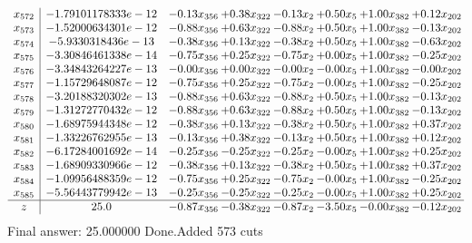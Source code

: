 \documentclass[8pt]{article}
\begin{document}
\[\begin{array}{c| c c@{\hskip 2pt} c@{\hskip 2pt} c@{\hskip 2pt} c@{\hskip 2pt} c@{\hskip 2pt} c@{\hskip 2pt} }
 x_{572}   &  -1.79101178333e-12 & -0.13 x_{356} & +  0.38 x_{322} & -0.13 x_{2} & +  0.50 x_{5} & +  1.00 x_{382} & +  0.12 x_{202}\\
 x_{573}   &  -1.52000634301e-12 & -0.88 x_{356} & +  0.63 x_{322} & -0.88 x_{2} & +  0.50 x_{5} & +  1.00 x_{382} & -0.13 x_{202}\\
 x_{574}   &  -5.9330318436e-13 & -0.38 x_{356} & +  0.13 x_{322} & -0.38 x_{2} & +  0.50 x_{5} & +  1.00 x_{382} & -0.63 x_{202}\\
 x_{575}   &  -3.30846461338e-14 & -0.75 x_{356} & +  0.25 x_{322} & -0.75 x_{2} & +  0.00 x_{5} & +  1.00 x_{382} & -0.25 x_{202}\\
 x_{576}   &  -3.34843264227e-13 & -0.00 x_{356} & +  0.00 x_{322} & -0.00 x_{2} & -0.00 x_{5} & +  1.00 x_{382} & -0.00 x_{202}\\
 x_{577}   &  -1.15729648087e-12 & -0.75 x_{356} & +  0.25 x_{322} & -0.75 x_{2} & -0.00 x_{5} & +  1.00 x_{382} & -0.25 x_{202}\\
 x_{578}   &  -3.20188320302e-13 & -0.88 x_{356} & +  0.63 x_{322} & -0.88 x_{2} & +  0.50 x_{5} & +  1.00 x_{382} & -0.13 x_{202}\\
 x_{579}   &  -1.31272770432e-12 & -0.88 x_{356} & +  0.63 x_{322} & -0.88 x_{2} & +  0.50 x_{5} & +  1.00 x_{382} & -0.13 x_{202}\\
 x_{580}   &  -1.68975944348e-12 & -0.38 x_{356} & +  0.13 x_{322} & -0.38 x_{2} & +  0.50 x_{5} & +  1.00 x_{382} & +  0.37 x_{202}\\
 x_{581}   &  -1.33226762955e-13 & -0.13 x_{356} & +  0.38 x_{322} & -0.13 x_{2} & +  0.50 x_{5} & +  1.00 x_{382} & +  0.12 x_{202}\\
 x_{582}   &  -6.17284001692e-14 & -0.25 x_{356} & -0.25 x_{322} & -0.25 x_{2} & -0.00 x_{5} & +  1.00 x_{382} & +  0.25 x_{202}\\
 x_{583}   &  -1.68909330966e-12 & -0.38 x_{356} & +  0.13 x_{322} & -0.38 x_{2} & +  0.50 x_{5} & +  1.00 x_{382} & +  0.37 x_{202}\\
 x_{584}   &  -1.09956488359e-12 & -0.75 x_{356} & +  0.25 x_{322} & -0.75 x_{2} & -0.00 x_{5} & +  1.00 x_{382} & -0.25 x_{202}\\
 x_{585}   &  -5.56443779942e-13 & -0.25 x_{356} & -0.25 x_{322} & -0.25 x_{2} & -0.00 x_{5} & +  1.00 x_{382} & +  0.25 x_{202}\\
\hline
z    &  25.0 & -0.87 x_{356} & -0.38 x_{322} & -0.87 x_{2} & -3.50 x_{5} & -0.00 x_{382} & -0.12 x_{202}\\
\end{array}\]
 Final answer: 25.000000 
Done.Added 573 cuts 
\end{document}
